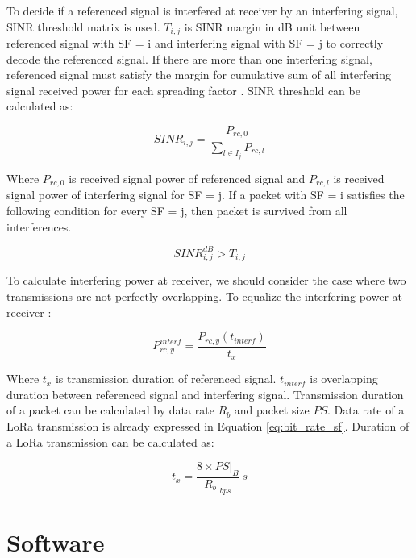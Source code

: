 To decide if a referenced signal is interfered at receiver by an interfering signal, SINR threshold matrix is used. $T_{i,j}$ is SINR margin in dB unit between referenced signal with SF = i and interfering signal with SF = j to correctly decode the referenced signal. If there are more than one interfering signal, referenced signal must satisfy the margin for cumulative sum of all interfering signal received power for each spreading factor \cite{7996384}. SINR threshold can be calculated as:

\begin{equation} \label{eq:sinr_db}
SINR_{i,j} = \dfrac{P_{rc,0}}{\sum_{l \in I_j} P_{rc,l}}
\end{equation}

Where $P_{rc,0}$ is received signal power of referenced signal and $P_{rc,l}$ is received signal power of interfering signal for SF = j. If a packet with SF = i satisfies the following condition for every SF = j, then packet is survived from all interferences.

\begin{equation} \label{eq:sinr_t}
SINR_{i,j}^{dB} > T_{i,j}
\end{equation}

To calculate interfering power at receiver, we should consider the case where two transmissions are not perfectly overlapping. To equalize the interfering power at receiver \cite{7996384}:

\begin{equation} \label{eq:p_interference}
P_{rc,y}^{interf} = \dfrac{P_{rc,y}(t_{interf})}{t_{x}}
\end{equation}

Where $t_{x}$ is transmission duration of referenced signal. $t_{interf}$ is overlapping duration between referenced signal and interfering signal. Transmission duration of a packet can be calculated by data rate $R_{b}$ and packet size $PS$. Data rate of a LoRa transmission is already expressed in Equation \ref{eq:bit_rate_sf}. Duration of a LoRa transmission can be calculated as:

\begin{equation} \label{eq:transmission_duration}
t_{x} = \dfrac{8 \times PS|_{B}}{R_{b}|_{bps}}  \ s
\end{equation}

\section{Software}

